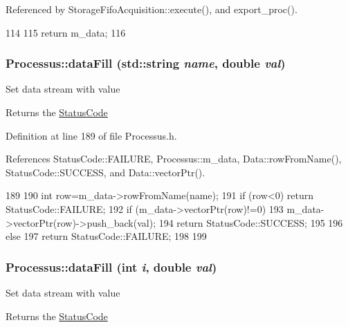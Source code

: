 Referenced by StorageFifoAcquisition::execute(), and export\_\-proc().


\begin{DoxyCode}
114               {
115     return m_data;
116   }
\end{DoxyCode}
\hypertarget{classProcessus_aa31ab71711f7af6a729441ff573f69c9}{
\subsubsection[{dataFill}]{ Processus::dataFill (std::string {\em name}, \/  double {\em val})}}
\label{classProcessus_aa31ab71711f7af6a729441ff573f69c9}
Set data stream with value \begin{DoxyReturn}{Returns}
the \hyperlink{classStatusCode}{StatusCode} 
\end{DoxyReturn}


Definition at line 189 of file Processus.h.

References StatusCode::FAILURE, Processus::m\_\-data, Data::rowFromName(), StatusCode::SUCCESS, and Data::vectorPtr().


\begin{DoxyCode}
189                                                  {
190     int row=m_data->rowFromName(name);
191     if (row<0) return StatusCode::FAILURE;
192     if (m_data->vectorPtr(row)!=0){
193       m_data->vectorPtr(row)->push_back(val);
194       return StatusCode::SUCCESS;
195     }
196     else {
197       return StatusCode::FAILURE;
198     }
199   }
\end{DoxyCode}
\hypertarget{classProcessus_a0d093b48f3218a088ba030e24372f18c}{
\subsubsection[{dataFill}]{ Processus::dataFill (int {\em i}, \/  double {\em val})}}
\label{classProcessus_a0d093b48f3218a088ba030e24372f18c}
Set data stream with value \begin{DoxyReturn}{Returns}
the \hyperlink{classStatusCode}{StatusCode} 
\end{DoxyReturn}


